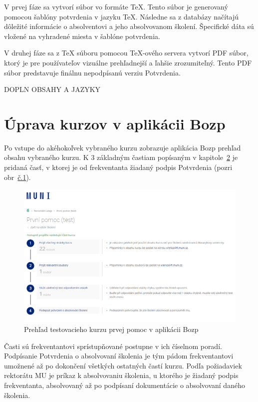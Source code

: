 \documentclass[
  digital,     %
  oneside,     %
  nosansbold,  %
  nocolorbold, %
  lof,         %
  nolot,         %
]{fithesis4}
\begin{document}
V prvej fáze sa vytvorí súbor vo formáte \TeX. Tento súbor je generovaný pomocou šablóny potvrdenia v jazyku \TeX. Následne sa z databázy načítajú dôležité informácie o absolventovi a jeho absolvovanom školení. Špecifické dáta sú vložené na vyhradené miesta v šablóne potvrdenia.

V druhej fáze sa z \TeX{} súboru pomocou \TeX-ového servera vytvorí PDF súbor, ktorý je pre používateľov vizuálne prehľadnejší a ľahšie zrozumiteľný. Tento PDF súbor predstavuje finálnu nepodpísanú verziu Potvrdenia.

DOPLN OBSAHY A JAZYKY

\section{Úprava kurzov v aplikácii Bozp}
Po vstupe do akéhokoľvek vybraného kurzu zobrazuje aplikácia Bozp prehľad obsahu vybraného kurzu. K 3 základným častiam popísaným v kapitole~\hyperref[kap-2]{2} je pridaná časť, v ktorej je od frekventanta žiadaný podpis Potvrdenia (pozri obr~\hyperref[obr1]{č.1}).

\begin{figure}
  \begin{center}
    \includegraphics[width=\textwidth]{prehledtestovnehokurzu.png}
  \end{center}
  \caption{Prehľad testovacieho kurzu prvej pomoc v aplikácii Bozp}
  \label{obr1}
\end{figure}

\noindent
Časti sú frekventantovi sprístupňované postupne v ich číselnom poradí.
Podpísanie Potvrdenia o absolvovaní školenia je tým pádom frekventantovi umožnené až po dokončení všetkých ostatných častí kurzu. Podľa požiadaviek rektorátu MU je príkaz k absolvovaniu školenia, u ktorého je žiadaný podpis frekventanta, absolvovaný až po podpísaní dokumentácie o absolvovaní daného školenia.
\end{document}
